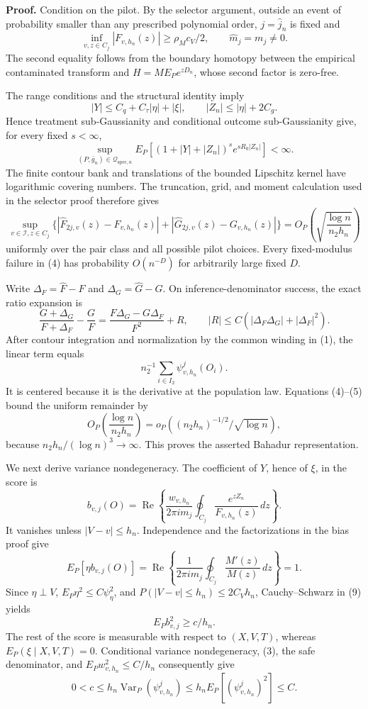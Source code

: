 \textbf{Proof.}
Condition on the pilot. By the selector argument, outside an event of probability smaller than any prescribed polynomial order, \(j=\widehat j_n\) is fixed and
\[
 \inf_{v,z\in C_j}|F_{v,h_n}(z)|\ge\rho_Mc_V/2,
 \qquad \widehat m_j=m_j\ne0. \tag{1}
\]
The second equality follows from the boundary homotopy between the empirical contaminated transform and \(H=M E_Pe^{zD_n}\), whose second factor is zero-free.

The range conditions and the structural identity imply
\[
 |Y|\le C_q+C_\tau|\eta|+|\xi|,
 \qquad |Z_n|\le|\eta|+2C_g. \tag{2}
\]
Hence treatment sub-Gaussianity and conditional outcome sub-Gaussianity give, for every fixed \(s<\infty\),
\[
 \sup_{(P,\bar g_n)\in\mathcal Q_{\mathrm{spec},n}}
 E_P[(1+|Y|+|Z_n|)^s e^{sR_0|Z_n|}]<\infty. \tag{3}
\]
The finite contour bank and translations of the bounded Lipschitz kernel have logarithmic covering numbers. The truncation, grid, and moment calculation used in the selector proof therefore gives
\[
 \sup_{v\in\mathcal I,z\in C_j}
 \{ |\widehat F_{2j,v}(z)-F_{v,h_n}(z)|
   +|\widehat G_{2j,v}(z)-G_{v,h_n}(z)|\}
 =O_P\!\left(\sqrt{\frac{\log n}{n_2h_n}}\right) \tag{4}
\]
uniformly over the pair class and all possible pilot choices. Every fixed-modulus failure in (4) has probability \(O(n^{-D})\) for arbitrarily large fixed \(D\).

Write \(\Delta_F=\widehat F-F\) and \(\Delta_G=\widehat G-G\). On inference-denominator success, the exact ratio expansion is
\[
 \frac{G+\Delta_G}{F+\Delta_F}-\frac GF
 =\frac{F\Delta_G-G\Delta_F}{F^2}+R,
 \qquad |R|\le C(|\Delta_F\Delta_G|+|\Delta_F|^2). \tag{5}
\]
After contour integration and normalization by the common winding in (1), the linear term equals
\[
 n_2^{-1}\sum_{i\in I_2}\psi^j_{v,h_n}(O_i). \tag{6}
\]
It is centered because it is the derivative at the population law. Equations (4)--(5) bound the uniform remainder by
\[
 O_P\!\left(\frac{\log n}{n_2h_n}\right)
 =o_P\!\left((n_2h_n)^{-1/2}/\sqrt{\log n}\right), \tag{7}
\]
because \(n_2h_n/(\log n)^3\to\infty\). This proves the asserted Bahadur representation.

We next derive variance nondegeneracy. The coefficient of \(Y\), hence of \(\xi\), in the score is
\[
 b_{v,j}(O)=\operatorname{Re}\left\{
 \frac{w_{v,h_n}}{2\pi i m_j}
 \oint_{C_j}\frac{e^{zZ_n}}{F_{v,h_n}(z)}\,dz\right\}. \tag{8}
\]
It vanishes unless \(|V-v|\le h_n\). Independence and the factorizations in the bias proof give
\[
 E_P[\eta b_{v,j}(O)]
 =\operatorname{Re}\left\{\frac{1}{2\pi i m_j}
 \oint_{C_j}\frac{M'(z)}{M(z)}\,dz\right\}=1. \tag{9}
\]
Since \(\eta\perp V\), \(E_P\eta^2\le C\psi_\eta^2\), and \(P(|V-v|\le h_n)\le2C_Vh_n\), Cauchy--Schwarz in (9) yields
\[
 E_Pb_{v,j}^2\ge c/h_n. \tag{10}
\]
The rest of the score is measurable with respect to \((X,V,T)\), whereas \(E_P(\xi\mid X,V,T)=0\). Conditional variance nondegeneracy, (3), the safe denominator, and \(E_Pw_{v,h_n}^2\le C/h_n\) consequently give
\[
 0<c\le h_n\operatorname{Var}_P(\psi^j_{v,h_n})
 \le h_nE_P[(\psi^j_{v,h_n})^2]\le C. \tag{11}
\]

